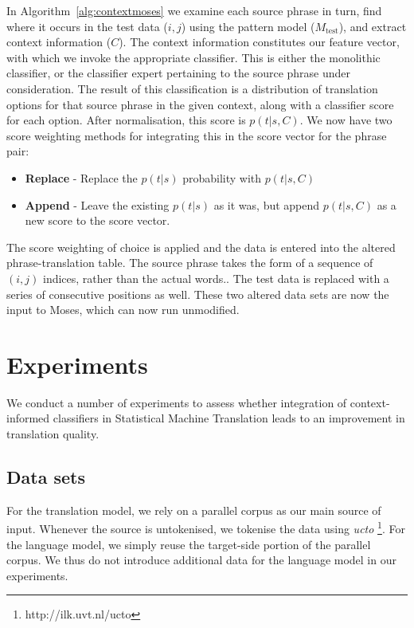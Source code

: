 \documentclass[11pt]{article}
\theoremstyle{break}
\begin{document}
In Algorithm~\ref{alg:contextmoses} we examine each source phrase in turn, find
where it occurs in the test data ($i,j$) using the pattern model
($M_{\text{test}}$), and extract context information ($C$). The context
information constitutes our feature vector, with which we invoke the
appropriate classifier. This is either the monolithic classifier, or the
classifier expert pertaining to the source phrase under consideration. The
result of this classification is a distribution of translation options for that
source phrase in the given context, along with a classifier score for each
option. After normalisation, this score is $p(t|s,C)$. We now have two score
weighting methods for integrating this in the score vector for the phrase pair:

\begin{itemize}
  \item \textbf{Replace} - Replace the $p(t|s)$ probability with $p(t|s,C)$
  \item \textbf{Append} - Leave the existing $p(t|s)$ as it was, but append
    $p(t|s,C)$ as a new score to the score vector.
\end{itemize}

The score weighting of choice is applied and the data is entered into the
altered phrase-translation table. The source phrase takes the form of a
sequence of $(i,j)$ indices, rather than the actual words..  The test data is
replaced with a series of consecutive positions as well. These two altered data
sets are now the input to Moses, which can now run unmodified. 

\section{Experiments}

We conduct a number of experiments to assess whether integration of
context-informed classifiers in Statistical Machine Translation leads to
an improvement in translation quality. 

\subsection{Data sets}

For the translation model, we rely on a parallel corpus as our main source of
input. Whenever the source is untokenised, we tokenise the data using \emph{ucto}
\footnote{http://ilk.uvt.nl/ucto}. For the language
model, we simply reuse the target-side portion of the parallel corpus. We thus do not
introduce additional data for the language model in our experiments.
\end{document}

